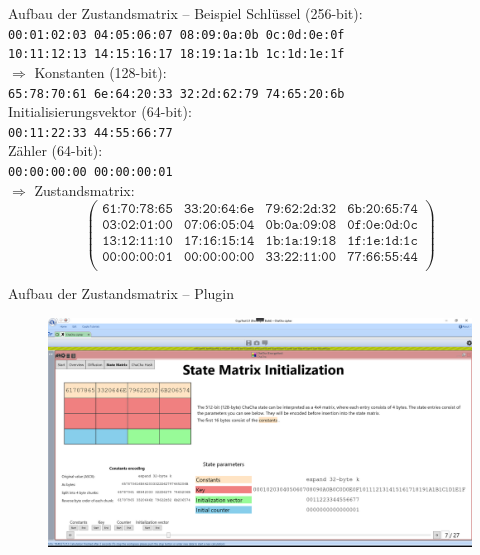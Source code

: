 \documentclass{beamer}
\begin{document}
\begin{frame}{Aufbau der Zustandsmatrix -- Beispiel}
Schlüssel (256-bit): \\
\hspace{1em} \texttt{00:01:02:03 04:05:06:07 08:09:0a:0b 0c:0d:0e:0f} \\
\hspace{1em} \texttt{10:11:12:13 14:15:16:17 18:19:1a:1b 1c:1d:1e:1f} \\
$\Rightarrow$ Konstanten (128-bit): \\
\hspace{1em} \texttt{65:78:70:61 6e:64:20:33 32:2d:62:79 74:65:20:6b} \\
Initialisierungsvektor (64-bit): \\
\hspace{1em} \texttt{00:11:22:33 44:55:66:77} \\
Zähler (64-bit): \\
\hspace{1em} \texttt{00:00:00:00 00:00:00:01} \\
\vspace{1em} $\Rightarrow$ Zustandsmatrix:
\begin{equation*}
\begin{pmatrix}
\texttt{61:70:78:65}& \texttt{33:20:64:6e} & \texttt{79:62:2d:32} & \texttt{6b:20:65:74} \\
\texttt{03:02:01:00} & \texttt{07:06:05:04} & \texttt{0b:0a:09:08} & \texttt{0f:0e:0d:0c} \\
\texttt{13:12:11:10} & \texttt{17:16:15:14} & \texttt{1b:1a:19:18} & \texttt{1f:1e:1d:1c} \\
\texttt{00:00:00:01} & \texttt{00:00:00:00} & \texttt{33:22:11:00} & \texttt{77:66:55:44} \\
\end{pmatrix}
\end{equation*}
\end{frame}

\begin{frame}{Aufbau der Zustandsmatrix -- Plugin}
\begin{figure}
\center
\begin{minipage}{\textwidth}
\includegraphics[width=\textwidth]{figures/state-matrix/1-state-matrix-constants.png}
\end{minipage}
\end{figure}
\end{frame}
\end{document}
